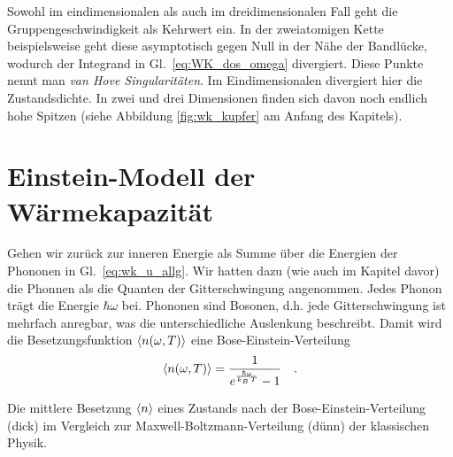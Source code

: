 Sowohl im eindimensionalen als auch im dreidimensionalen Fall geht die Gruppengeschwindigkeit als Kehrwert ein. In der zweiatomigen Kette beispielsweise geht diese asymptotisch gegen Null in der Nähe der Bandlücke, wodurch der Integrand in Gl.~\ref{eq:WK_dos_omega} divergiert. Diese Punkte nennt man \emph{van Hove Singularitäten}. Im Eindimensionalen divergiert hier die Zustandsdichte. In zwei und drei Dimensionen finden sich davon noch endlich hohe Spitzen (siehe Abbildung \ref{fig:wk_kupfer} am Anfang des Kapitels).





\section{Einstein-Modell der Wärmekapazität}

Gehen wir zurück zur inneren Energie als Summe über die Energien der Phononen in Gl.~\ref{eq:wk_u_allg}. Wir hatten dazu (wie auch im Kapitel davor) die Phonnen als die Quanten der Gitterschwingung angenommen. Jedes Phonon trägt die Energie $\hbar \omega$ bei. Phononen sind Bosonen, d.h. jede Gitterschwingung ist mehrfach anregbar, was die unterschiedliche Auslenkung beschreibt. Damit wird die Besetzungsfunktion $\braket{n (\omega,T) }$ eine Bose-Einstein-Verteilung
\begin{equation}
\braket{n (\omega,T) } = \frac{1}{e^{\frac{\hbar \omega}{k_B \, T} }- 1} \quad .
\end{equation}

\begin{marginfigure}

\caption{Die mittlere Besetzung $\braket{n}$ eines Zustands nach der Bose-Einstein-Verteilung (dick) im Vergleich zur Maxwell-Boltzmann-Verteilung (dünn) der klassischen Physik.}
\end{marginfigure}



